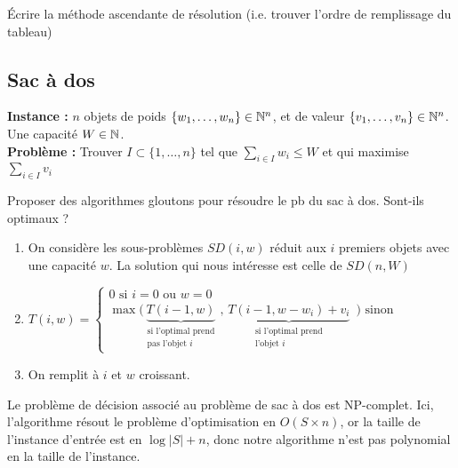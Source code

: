 \begin{exercise}
	Écrire la méthode ascendante de résolution (i.e. trouver l'ordre de remplissage du tableau)
\end{exercise}

\subsection{Sac à dos}

\textbf{Instance :} $n$ objets de poids $\{w_1, \dots, w_n\} \in \mathbb{N}^n$, et de valeur $\{v_1, \dots, v_n\}\in \mathbb{N}^n$. Une capacité $W \in \mathbb{N}$.\\
\textbf{Problème :} Trouver $I \subset \{1, \dots, n\}$ tel que $\sum\limits_{i \in I} w_i \leq W$ et qui maximise $\sum\limits_{i\in I} v_i$

\begin{exercise}
	Proposer des algorithmes gloutons pour résoudre le pb du sac à dos. Sont-ils optimaux ?
\end{exercise}

\begin{algo}
	\enspace
	\begin{enumerate}
		\item On considère les sous-problèmes $SD(i,w)$ réduit aux $i$ premiers objets avec une capacité $w$. La solution qui nous intéresse est celle de $SD(n, W)$
		\item $T(i, w)= \left\{ \begin{array}{l}
			0 \text{ si } i = 0 \text{ ou } w = 0\\
			\max\Big( \underset{\substack{\text{si l'optimal prend}\\\text{pas l'objet }i}}{\underbrace{T(i-1, w)}} \,,\, \underset{\substack{\text{si l'optimal prend}\\\text{l'objet }i}}{\underbrace{T(i-1, w-w_i) + v_i}} \enspace \Big) \text{ sinon}
		\end{array} \right.$
		\item On remplit à $i$ et $w$ croissant.
	\end{enumerate}
\end{algo}

\begin{rem}
	Le problème de décision associé au problème de sac à dos est NP-complet. Ici, l'algorithme résout le problème d'optimisation en $O(S\times n)$, or la taille de l'instance d'entrée est en $\log|S| + n$, donc notre algorithme n'est pas polynomial en la taille de l'instance.
\end{rem}

